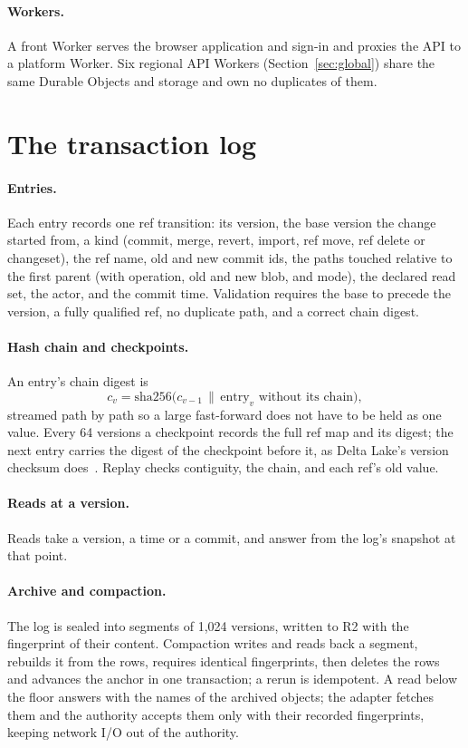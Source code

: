 \documentclass[11pt]{article}
\begin{document}
\paragraph{Workers.} A front Worker serves the browser application and sign-in and
proxies the API to a platform Worker. Six regional API Workers (Section~\ref{sec:global})
share the same Durable Objects and storage and own no duplicates of them.

\section{The transaction log}
\label{sec:log}

\paragraph{Entries.} Each entry records one ref transition: its version, the base
version the change started from, a kind (commit, merge, revert, import, ref move, ref
delete or changeset), the ref name, old and new commit ids, the paths touched relative
to the first parent (with operation, old and new blob, and mode), the declared read set,
the actor, and the commit time. Validation requires the base to precede the version, a
fully qualified ref, no duplicate path, and a correct chain digest.

\paragraph{Hash chain and checkpoints.} An entry's chain digest is
\[ c_v = \mathrm{sha256}\bigl(c_{v-1} \,\|\, \text{entry}_v \text{ without its chain}\bigr), \]
streamed path by path so a large fast-forward does not have to be held as one value. Every 64
versions a checkpoint records the full ref map and its digest; the next entry carries
the digest of the checkpoint before it, as Delta Lake's version checksum
does~\cite{armbrust2020delta}. Replay checks contiguity, the chain, and each ref's old
value.

\paragraph{Reads at a version.} Reads take a version, a time or a commit, and answer
from the log's snapshot at that point.

\paragraph{Archive and compaction.} The log is sealed into segments of 1,024 versions,
written to R2 with the fingerprint of their content. Compaction writes and reads back a
segment, rebuilds it from the rows, requires identical fingerprints, then deletes the
rows and advances the anchor in one transaction; a rerun is idempotent. A read below the
floor answers with the names of the archived objects; the adapter fetches them and the
authority accepts them only with their recorded fingerprints, keeping network I/O out
of the authority.
\end{document}
